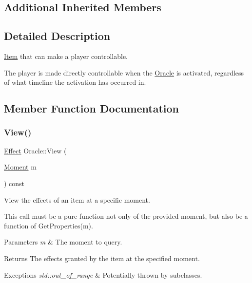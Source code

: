 \subsection*{Additional Inherited Members}


\subsection{Detailed Description}
\hyperlink{classitem_1_1_item}{Item} that can make a player controllable. 

The player is made directly controllable when the \hyperlink{classitem_1_1_oracle}{Oracle} is activated, regardless of what timeline the activation has occurred in. 

\subsection{Member Function Documentation}
\mbox{\label{classitem_1_1_oracle_ade8c5db0ab73bfa61d5dbe2c9c405f5c}} 
\subsubsection{\texorpdfstring{View()}{View()}}
{\footnotesize\ttfamily \hyperlink{classitem_1_1_effect}{Effect} Oracle\+::\+View (\begin{DoxyParamCaption}\item[{\hyperlink{classtimeplane_1_1_moment}{Moment}}]{m }\end{DoxyParamCaption}) const\hspace{0.3cm}{\ttfamily [virtual]}}



View the effects of an item at a specific moment. 

This call must be a pure function not only of the provided moment, but also be a function of {\ttfamily Get\+Properties(m)}. 
\begin{DoxyParams}{Parameters}
{\em m} & The moment to query. \\
\hline
\end{DoxyParams}
\begin{DoxyReturn}{Returns}
The effects granted by the item at the specified moment. 
\end{DoxyReturn}

\begin{DoxyExceptions}{Exceptions}
{\em std\+::out\+\_\+of\+\_\+range} & Potentially thrown by subclasses. \\
\hline
\end{DoxyExceptions}



